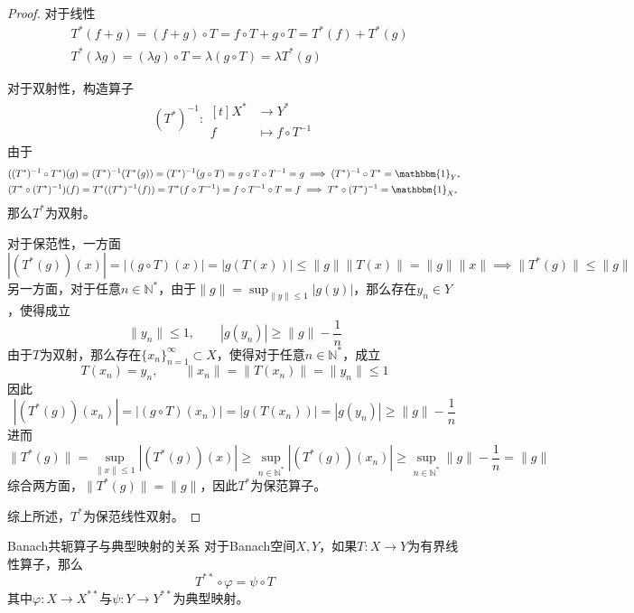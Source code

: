 \documentclass[lang = cn, scheme = chinese, thmcnt = section]{elegantbook}
\newcommand{\N}{\mathbb{N}}            %
\newcommand{\sub}{\subset}             %
\begin{document}
\begin{proof}
	对于线性
	\begin{align*}
		& T^*(f+g)=(f+g)\circ T=f\circ T+g\circ T=T^*(f)+T^*(g)\\
		& T^*(\lambda g)=(\lambda g)\circ T=\lambda(g\circ T)=\lambda T^*(g)
	\end{align*}
	
	对于双射性，构造算子
	\begin{align*}
		(T^*)^{-1}:\begin{aligned}[t]
			X^*&\longrightarrow Y^*\\
			f&\longmapsto f\circ T^{-1}
		\end{aligned}
	\end{align*}
	由于
	\begin{align*}
		& ((T^*)^{-1}\circ T^*)(g)
		= (T^*)^{-1}(T^*(g))
		= (T^*)^{-1}(g\circ T)
		= g\circ T\circ T^{-1}
		= g
		\implies
		(T^*)^{-1}\circ T^*=\mathbbm{1}_{Y^*}\\
		& (T^*\circ (T^*)^{-1})(f)
		= T^*((T^*)^{-1}(f))
		= T^*(f\circ T^{-1})
		= f\circ T^{-1}\circ T
		= f
		\implies
		T^*\circ (T^*)^{-1} = \mathbbm{1}_{X^*}
	\end{align*}
	那么$T^*$为双射。
	
	对于保范性，一方面
	$$
	|(T^*(g))(x)|
	= |(g\circ T)(x)|
	= |g(T(x))|
	\le \|g\|\|T(x)\|
	= \|g\|\|x\|\implies
	\|T^*(g)\|\le \|g\|
	$$
	另一方面，对于任意$n\in\N^*$，由于$\displaystyle\|g\|=\sup_{\|y\|\le 1}|g(y)|$，那么存在$y_n\in Y$，使得成立
	$$
	\|y_n\|\le 1,\qquad |g(y_n)|\ge \|g\|-\frac{1}{n}
	$$
	由于$T$为双射，那么存在$\{x_n\}_{n=1}^{\infty}\sub X$，使得对于任意$n\in\N^*$，成立
	$$
	T(x_n)=y_n,\qquad \|x_n\|=\|T(x_n)\|=\|y_n\|\le 1
	$$
	因此
	$$
	|(T^*(g))(x_n)|
	= |(g\circ T)(x_n)|
	= |g(T(x_n))|
	= |g(y_n)|
	\ge \|g\|-\frac{1}{n}
	$$
	进而
	$$
	\|T^*(g)\|
	= \sup_{\|x\|\le 1}|(T^*(g))(x)|
	\ge \sup_{n\in\N^*}|(T^*(g))(x_n)|
	\ge \sup_{n\in\N^*}\|g\|-\frac{1}{n}
	= \|g\|
	$$
	综合两方面，$\|T^*(g)\|=\|g\|$，因此$T^*$为保范算子。
	
	综上所述，$T^*$为保范线性双射。
\end{proof}

\begin{theorem}{}{Banach共轭算子与典型映射的关系}
	对于Banach空间$X,Y$，如果$T:X\to Y$为有界线性算子，那么
	$$
	T^{**}\circ \varphi = \psi \circ T
	$$
	其中$\varphi:X\to X^{**}$与$\psi:Y\to Y^{**}$为典型映射。
\end{theorem}
\end{document}
